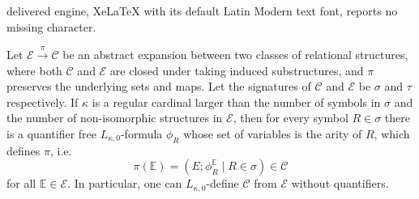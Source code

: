 \documentclass[10pt,a4paper]{amsart}
\newcommand{\cat}[1]{\mathcal{#1}}
\newcommand{\str}[1]{\mathbb{#1}}
\begin{document}
delivered engine, XeLaTeX with its default Latin Modern text font, reports no missing character.
\begin{prop}
\label{prop:definability}
    Let $\cat E\xrightarrow{\pi}\cat C$ be an abstract expansion between two classes of relational structures, where both $\cat C$ and $\cat E$ are closed under taking induced substructures, and $\pi$ preserves the underlying sets and maps. Let the signatures of $\cat C$ and $\cat E$ be $\sigma$ and $\tau$ respectively. If $\kappa$ is a regular cardinal larger than the number of symbols in $\sigma$ and the number of non-isomorphic structures in $\cat E$, then for every symbol $R\in\sigma$ there is a quantifier free $L_{\kappa,0}$-formula $\phi_R$ whose set of variables is the arity of $R$, which defines $\pi$, i.e.
    $$
    \pi(\str E) = (E; \phi_R^{\str E}\mid R\in\sigma)\in\cat C
    $$
    for all $\str E\in\cat E$.
    In particular, one can $L_{\kappa,0}$-define $\cat C$ from $\cat E$ without quantifiers.
\end{prop}
\end{document}
